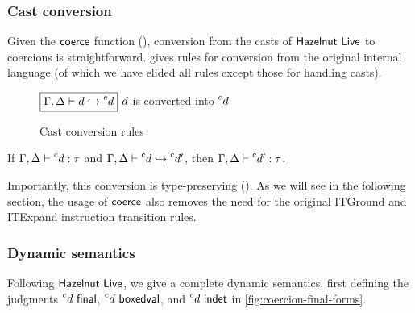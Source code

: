\documentclass[index.tex]{subfiles}
\begin{document}
\subsubsection{Cast conversion}
\label{sec:coercion-conversion}
Given the $\coerce$ function (), conversion from the casts of
$\HazelnutLive$ to coercions is straightforward.  gives rules for
conversion from the original internal language (of which we have elided all rules except those for
handling casts).

\begin{figure}[htb!]
  $\judgbox{\ctxConvertsInto{\andCtx{\ctx}{\holeCtx}}{\IEMVO}{\IEMV}}$ $\IEMVO$ is converted into $\IEMV$
  
  \begin{mathpar}
  \end{mathpar}
  \caption{Cast conversion rules}
  \label{fig:coercion-conversion}
\end{figure}

\begin{theorem}[name=Cast conversion type preservation, label=thm:coercion-type-preservation]
  If $\ctxAssignType{\andCtx{\ctx}{\holeCtx}}{\IEMV}{\TMV}$ and
  $\ctxConvertsInto{\andCtx{\ctx}{\holeCtx}}{\IEMV}{\IEMV'}$, then
  $\ctxAssignType{\andCtx{\ctx}{\holeCtx}}{\IEMV'}{\TMV}$.
\end{theorem}
%
Importantly, this conversion is type-preserving (). As we will
see in the following section, the usage of $\coerce$ also removes the need for the original ITGround
and ITExpand instruction transition rules.

\subsubsection{Dynamic semantics}
\label{sec:coercion-dynamics}
Following $\HazelnutLive$, we give a complete dynamic semantics, first defining the judgments
$\isFinal{\IEMV}$, $\isBoxedVal{\IEMV}$, and $\isIndet{\IEMV}$ in \cref{fig:coercion-final-forms}.
\end{document}
